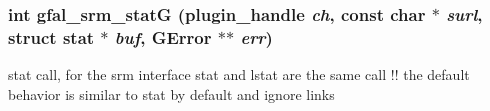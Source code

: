 \subsubsection{\setlength{\rightskip}{0pt plus 5cm}int gfal\_\-srm\_\-stat\-G (plugin\_\-handle {\em ch}, const char $\ast$ {\em surl}, struct stat $\ast$ {\em buf}, GError $\ast$$\ast$ {\em err})}\label{gfal__common__srm__stat_8c_46380c3a3586c2ad7fe5bcdc5e1c43fc}


stat call, for the srm interface stat and lstat are the same call !! the default behavior is similar to stat by default and ignore links 